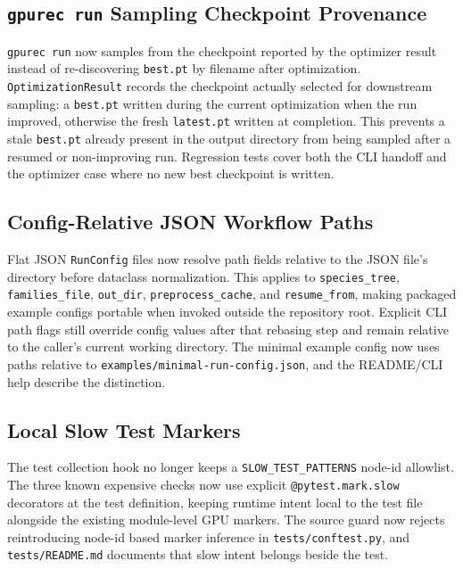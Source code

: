 \documentclass[11pt]{article}
\begin{document}
\subsection{\texttt{gpurec run} Sampling Checkpoint Provenance}

\texttt{gpurec run} now samples from the checkpoint reported by the optimizer
result instead of re-discovering \texttt{best.pt} by filename after
optimization.  \texttt{OptimizationResult} records the checkpoint actually
selected for downstream sampling: a \texttt{best.pt} written during the current
optimization when the run improved, otherwise the fresh \texttt{latest.pt}
written at completion.  This prevents a stale \texttt{best.pt} already present
in the output directory from being sampled after a resumed or non-improving
run.  Regression tests cover both the CLI handoff and the optimizer case where
no new best checkpoint is written.

\subsection{Config-Relative JSON Workflow Paths}

Flat JSON \texttt{RunConfig} files now resolve path fields relative to the JSON
file's directory before dataclass normalization.  This applies to
\texttt{species\_tree}, \texttt{families\_file}, \texttt{out\_dir},
\texttt{preprocess\_cache}, and \texttt{resume\_from}, making packaged example
configs portable when invoked outside the repository root.  Explicit CLI path
flags still override config values after that rebasing step and remain relative
to the caller's current working directory.  The minimal example config now uses
paths relative to \texttt{examples/minimal-run-config.json}, and the README/CLI
help describe the distinction.

\subsection{Local Slow Test Markers}

The test collection hook no longer keeps a \texttt{SLOW\_TEST\_PATTERNS}
node-id allowlist.  The three known expensive checks now use explicit
\texttt{@pytest.mark.slow} decorators at the test definition, keeping runtime
intent local to the test file alongside the existing module-level GPU markers.
The source guard now rejects reintroducing node-id based marker inference in
\texttt{tests/conftest.py}, and \texttt{tests/README.md} documents that slow
intent belongs beside the test.
\end{document}
